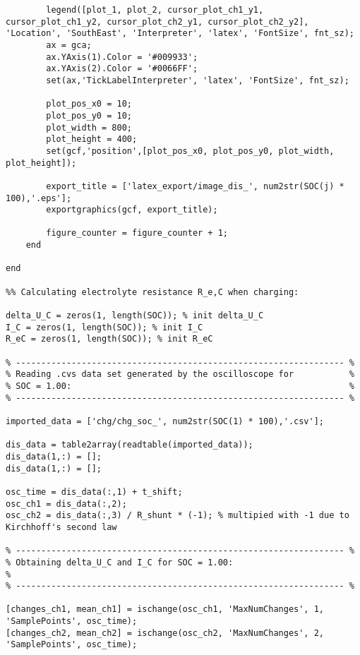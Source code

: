 \begin{lstlisting}
        legend([plot_1, plot_2, cursor_plot_ch1_y1, cursor_plot_ch1_y2, cursor_plot_ch2_y1, cursor_plot_ch2_y2], 'Location', 'SouthEast', 'Interpreter', 'latex', 'FontSize', fnt_sz);
        ax = gca;
        ax.YAxis(1).Color = '#009933';
        ax.YAxis(2).Color = '#0066FF';
        set(ax,'TickLabelInterpreter', 'latex', 'FontSize', fnt_sz);
        
        plot_pos_x0 = 10;
        plot_pos_y0 = 10;
        plot_width = 800;
        plot_height = 400;
        set(gcf,'position',[plot_pos_x0, plot_pos_y0, plot_width, plot_height]);
        
        export_title = ['latex_export/image_dis_', num2str(SOC(j) * 100),'.eps'];
        exportgraphics(gcf, export_title);
        
        figure_counter = figure_counter + 1;
    end
    
end

%% Calculating electrolyte resistance R_e,C when charging:

delta_U_C = zeros(1, length(SOC)); % init delta_U_C
I_C = zeros(1, length(SOC)); % init I_C
R_eC = zeros(1, length(SOC)); % init R_eC

% ----------------------------------------------------------------- %
% Reading .cvs data set generated by the oscilloscope for           %
% SOC = 1.00:                                                       %
% ----------------------------------------------------------------- %

imported_data = ['chg/chg_soc_', num2str(SOC(1) * 100),'.csv'];

dis_data = table2array(readtable(imported_data));                         
dis_data(1,:) = [];                                                       
dis_data(1,:) = [];                                                       

osc_time = dis_data(:,1) + t_shift;                                     
osc_ch1 = dis_data(:,2);                                                
osc_ch2 = dis_data(:,3) / R_shunt * (-1); % multipied with -1 due to Kirchhoff's second law                             

% ----------------------------------------------------------------- %
% Obtaining delta_U_C and I_C for SOC = 1.00:                           %
% ----------------------------------------------------------------- %

[changes_ch1, mean_ch1] = ischange(osc_ch1, 'MaxNumChanges', 1, 'SamplePoints', osc_time); 
[changes_ch2, mean_ch2] = ischange(osc_ch2, 'MaxNumChanges', 2, 'SamplePoints', osc_time); 


\end{lstlisting}

